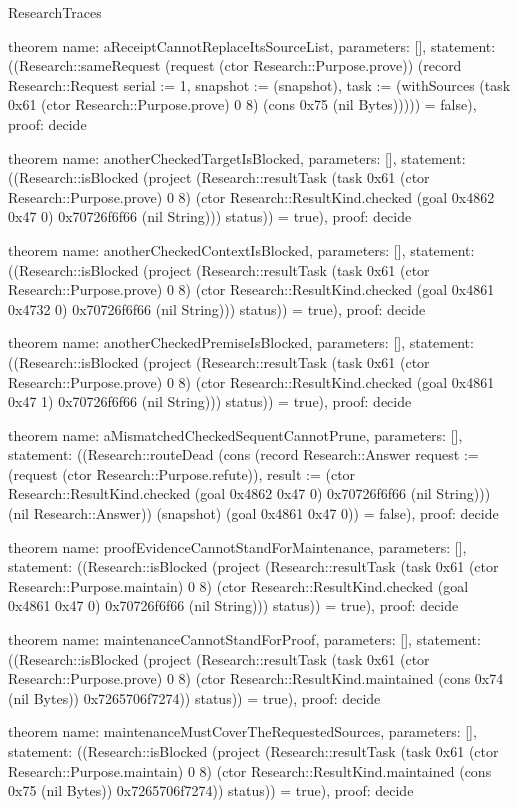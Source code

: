 \begin{lexlean}{ResearchTraces}
\begin{semanticmodule}
theorem{
  name: aReceiptCannotReplaceItsSourceList,
  parameters: [],
  statement: ((Research::sameRequest (request (ctor Research::Purpose.prove)) (record Research::Request {serial := 1, snapshot := (snapshot), task := (withSources (task 0x61 (ctor Research::Purpose.prove) 0 8) (cons 0x75 (nil Bytes)))})) = false),
  proof: decide{}
}

theorem{
  name: anotherCheckedTargetIsBlocked,
  parameters: [],
  statement: ((Research::isBlocked (project (Research::resultTask (task 0x61 (ctor Research::Purpose.prove) 0 8) (ctor Research::ResultKind.checked (goal 0x4862 0x47 0) 0x70726f6f66 (nil String))) status)) = true),
  proof: decide{}
}

theorem{
  name: anotherCheckedContextIsBlocked,
  parameters: [],
  statement: ((Research::isBlocked (project (Research::resultTask (task 0x61 (ctor Research::Purpose.prove) 0 8) (ctor Research::ResultKind.checked (goal 0x4861 0x4732 0) 0x70726f6f66 (nil String))) status)) = true),
  proof: decide{}
}

theorem{
  name: anotherCheckedPremiseIsBlocked,
  parameters: [],
  statement: ((Research::isBlocked (project (Research::resultTask (task 0x61 (ctor Research::Purpose.prove) 0 8) (ctor Research::ResultKind.checked (goal 0x4861 0x47 1) 0x70726f6f66 (nil String))) status)) = true),
  proof: decide{}
}

theorem{
  name: aMismatchedCheckedSequentCannotPrune,
  parameters: [],
  statement: ((Research::routeDead (cons (record Research::Answer {request := (request (ctor Research::Purpose.refute)), result := (ctor Research::ResultKind.checked (goal 0x4862 0x47 0) 0x70726f6f66 (nil String))}) (nil Research::Answer)) (snapshot) (goal 0x4861 0x47 0)) = false),
  proof: decide{}
}

theorem{
  name: proofEvidenceCannotStandForMaintenance,
  parameters: [],
  statement: ((Research::isBlocked (project (Research::resultTask (task 0x61 (ctor Research::Purpose.maintain) 0 8) (ctor Research::ResultKind.checked (goal 0x4861 0x47 0) 0x70726f6f66 (nil String))) status)) = true),
  proof: decide{}
}

theorem{
  name: maintenanceCannotStandForProof,
  parameters: [],
  statement: ((Research::isBlocked (project (Research::resultTask (task 0x61 (ctor Research::Purpose.prove) 0 8) (ctor Research::ResultKind.maintained (cons 0x74 (nil Bytes)) 0x7265706f7274)) status)) = true),
  proof: decide{}
}

theorem{
  name: maintenanceMustCoverTheRequestedSources,
  parameters: [],
  statement: ((Research::isBlocked (project (Research::resultTask (task 0x61 (ctor Research::Purpose.maintain) 0 8) (ctor Research::ResultKind.maintained (cons 0x75 (nil Bytes)) 0x7265706f7274)) status)) = true),
  proof: decide{}
}


\end{semanticmodule}
\end{lexlean}
